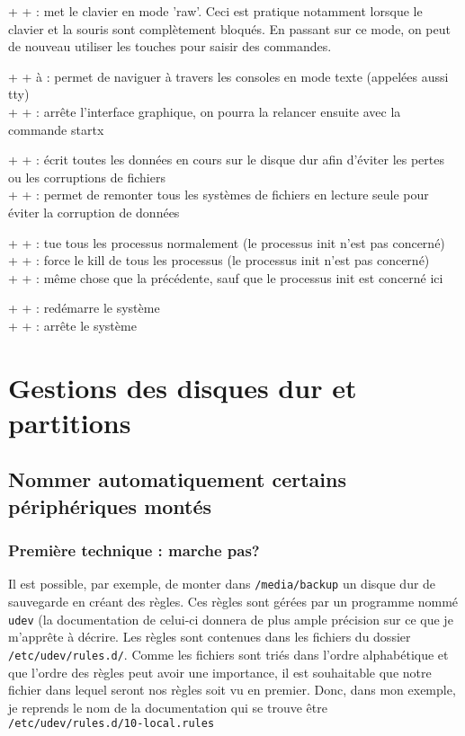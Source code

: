 \documentclass[a4paper,twoside]{article}
\begin{document}
 +  +  : met le clavier en mode 'raw'. Ceci est pratique notamment lorsque le clavier et la souris sont complètement bloqués. En passant sur ce mode, on peut de nouveau utiliser les touches pour saisir des commandes.

 +  +  à  : permet de naviguer à travers les consoles en mode texte (appelées aussi tty)\\
 +  +  : arrête l'interface graphique, on pourra la relancer ensuite avec la commande startx

 +  +  : écrit toutes les données en cours sur le disque dur afin d'éviter les pertes ou les corruptions de fichiers\\
 +  +  : permet de remonter tous les systèmes de fichiers en lecture seule pour éviter la corruption de données

 +  +  : tue tous les processus normalement (le processus init n'est pas concerné)\\
 +  +  : force le kill de tous les processus (le processus init n'est pas concerné)\\
 +  +  : même chose que la précédente, sauf que le processus init est concerné ici

 +  +  : redémarre le système\\
 +  +  : arrête le système

\section{Gestions des disques dur et partitions}
\subsection{Nommer automatiquement certains périphériques montés}
\subsubsection{Première technique : marche pas?}
Il est possible, par exemple, de monter dans \texttt{/media/backup} un disque dur de sauvegarde en créant des règles. Ces règles sont gérées par un programme nommé \texttt{udev} (la documentation de celui-ci donnera de plus ample précision sur ce que je m'apprête à décrire. Les règles sont contenues dans les fichiers du dossier \texttt{/etc/udev/rules.d/}. Comme les fichiers sont triés dans l'ordre alphabétique et que l'ordre des règles peut avoir une importance, il est souhaitable que notre fichier dans lequel seront nos règles soit vu en premier. Donc, dans mon exemple, je reprends le nom de la documentation qui se trouve être \texttt{/etc/udev/rules.d/10-local.rules}
\end{document}
